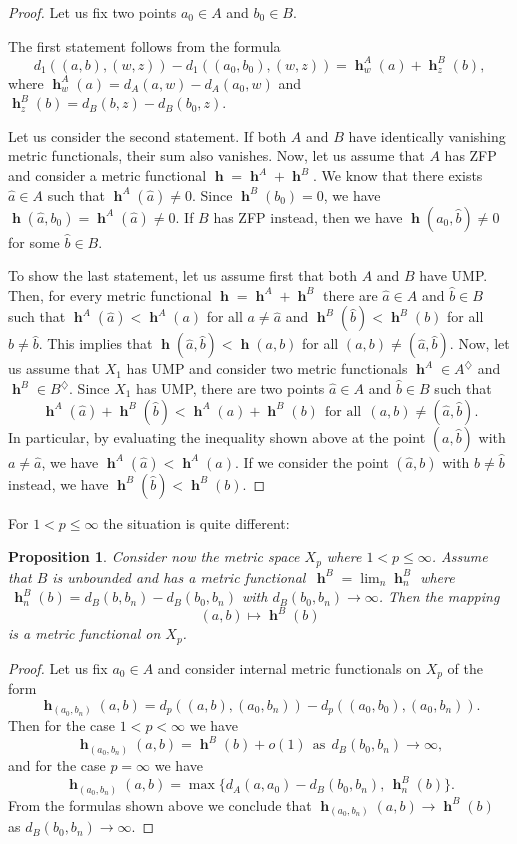 \documentclass[a4paper,12pt]{article}
\newtheorem{proposition}[theorem]{Proposition}
\theoremstyle{definition}
\numberwithin{equation}{section}
\numberwithin{equation}{section}
\DeclareMathOperator{\h}{\mathbf{h}} %
\begin{document}
\begin{proof}
Let us fix two points $a_0\in A$ and 
$b_0\in B$. 

The first statement follows from the 
formula
$$d_1((a,b),(w,z)) - d_1((a_0,b_0),(w,z)) 
    = \h_{w}^{A}(a)+ \h_{z}^{B}(b),$$ 
where $\h_{w}^{A}(a)=d_A(a,w)-d_A(a_0,w)$ 
and $\h_{z}^{B}(b)=d_B(b,z)-d_B(b_0,z)$.     

Let us consider the second statement. 
If both $A$ and $B$ have identically 
vanishing metric functionals, their sum 
also vanishes. Now, let us assume that $A$ 
has ZFP and consider a metric functional 
$\h = \h^A + \h^B$. We know that there exists
$\hat{a} \in A$ such that 
$\h^A(\hat{a})\neq 0$. Since $\h^B(b_0)=0$, 
we have 
$\h(\hat{a},b_0) = \h^A(\hat{a}) \neq 0$.
If $B$ has ZFP instead, then we have
$\h(a_0,\hat{b})\neq 0$ for some 
$\hat{b}\in B$.    

To show the last statement, let us assume 
first that both $A$ and $B$ have UMP. Then, 
for every metric functional $\h = \h^A + \h^B$
there are $\hat{a}\in A$ and $\hat{b}\in B$
such that $\h^A(\hat{a}) < \h^A(a)$ for all 
$a\neq \hat{a}$ and $\h^B(\hat{b}) < \h^B(b)$ 
for all $b\neq \hat{b}$. This implies that
$\h(\hat{a},\hat{b}) < \h(a,b)$ for all 
$(a,b) \neq (\hat{a},\hat{b})$. Now, let us 
assume that $X_1$ has UMP and consider two 
metric functionals $\h^A\in A^\diamondsuit$ 
and $\h^B\in B^\diamondsuit$. Since $X_1$ has
UMP, there are two points $\hat{a}\in A$ and 
$\hat{b}\in B$ such that 
$$
\h^A(\hat{a})+\h^B(\hat{b}) 
< \h^A(a)+\h^B(b)\ \ \text{for all}\ \ 
(a, b)\neq (\hat{a}, \hat{b}). 
$$
In particular, by evaluating the inequality
shown above at the point $(a,\hat{b})$ with 
$a\neq \hat{a}$, we have 
$\h^A(\hat{a}) < \h^A(a)$. If we consider
the point $(\hat{a},b)$ with $b\neq \hat{b}$ 
instead, we have $\h^B(\hat{b}) < \h^B(b)$.
\end{proof}

For $1<p\leq \infty$ the situation is quite 
different:

\begin{proposition} 
Consider now the metric space $X_p$ where 
$1<p\leq \infty$. Assume that $B$ is 
unbounded and has a metric functional 
$\,\h^B= \lim_n \h_n^B$ where 
$\,\h_n^B(b) = d_B(b, b_n) - d_B(b_0, b_n)$ 
with $d_B(b_0, b_n) \to \infty$. Then the 
mapping
$$(a,b) \mapsto \h^B(b)$$ 
is a metric functional on $X_p$.
\end{proposition}

\begin{proof}  
Let us fix $a_0\in A$ and consider internal 
metric functionals on $X_p$ of the form
$$
\h_{(a_0,b_n)}(a,b) = d_p((a,b),(a_0,b_n))
            - d_p((a_0,b_0),(a_0,b_n)).
$$  
Then for the case $1<p<\infty$ we have 
$$
\h_{(a_0, b_n)}(a,b) = \h^B(b) + o(1)\ \ 
    \text{as}\ \ d_B(b_0, b_n) \to \infty,
$$
and for the case $p=\infty$ we have
$$
\h_{(a_0, b_n)}(a,b) = 
\max\{d_A(a,a_0)-d_B(b_0,b_n),\,\h_n^B(b)\}.
$$
From the formulas shown above we conclude 
that $\h_{(a_0,b_n)}(a,b) \to \h^B(b)$ as 
$d_B(b_0, b_n) \to \infty$.
\end{proof}
 
\end{document}
